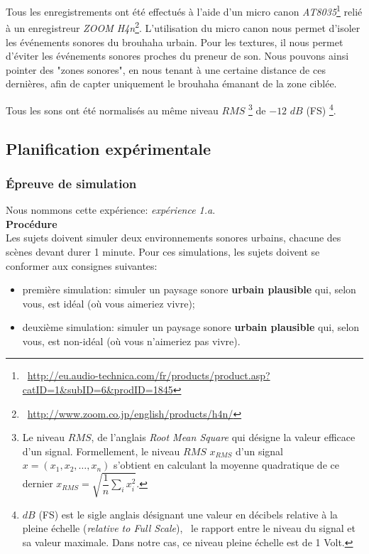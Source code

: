 Tous les enregistrements ont été effectués à l’aide d'un micro canon \emph{AT8035}\footnote{\cf~\url{http://eu.audio-technica.com/fr/products/product.asp?catID=1&subID=6&prodID=1845}} relié à un enregistreur \emph{ZOOM H4n}\footnote{\cf~\url{http://www.zoom.co.jp/english/products/h4n/}}. L’utilisation du micro canon nous permet d’isoler les événements sonores du brouhaha urbain. Pour les textures, il nous permet d’éviter les événements sonores proches du preneur de son. Nous pouvons ainsi pointer des "zones sonores", en nous tenant à une certaine distance de ces dernières, afin de capter uniquement le brouhaha émanant de la zone ciblée.

Tous les sons ont été normalisés au même niveau $RMS$ \footnote{Le niveau $RMS$, de l'anglais \emph{Root Mean Square} qui désigne la valeur efficace d'un signal. Formellement, le niveau $RMS$ $x_{RMS}$ d'un signal $x=(x_1,x_2,\ldots,x_n)$ s'obtient en calculant la moyenne quadratique de ce dernier $x_{RMS}=\sqrt{\dfrac{1}{n}\sum\limits_{i} x_i^2}$.} de $-12$ $dB$ (FS) \footnote{$dB$ (FS) est le sigle anglais désignant une valeur en décibels relative à la pleine échelle (\emph{relative to Full Scale}), \ie~le rapport entre le niveau du signal et sa valeur maximale. Dans notre cas, ce niveau pleine échelle est de 1 Volt.}.

\subsection{Planification expérimentale}

\subsubsection{Épreuve de simulation}
\label{sec:ch5_planExpSimu}

Nous nommons cette expérience: \emph{expérience 1.a}. \\

{\setlength{\parindent}{0cm}\textbf{Procédure}} \\

Les sujets doivent simuler deux environnements sonores urbains, chacune des scènes devant durer 1 minute. Pour ces simulations, les sujets doivent se conformer aux consignes suivantes:

\begin{itemize}
\item première simulation: simuler un paysage sonore \textbf{urbain plausible} qui, selon vous, est idéal (où vous aimeriez vivre);
\item deuxième simulation: simuler un paysage sonore \textbf{urbain plausible} qui, selon vous, est non-idéal (où vous n'aimeriez pas vivre).
\end{itemize}

